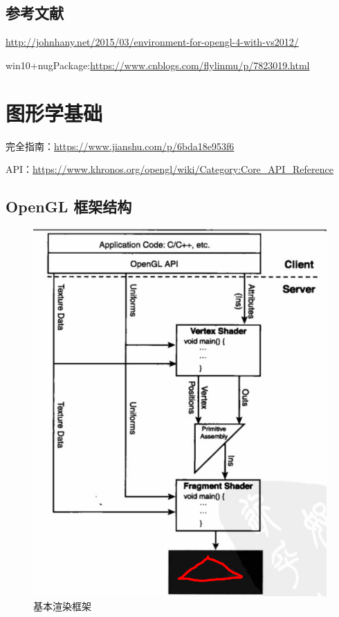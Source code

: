 \documentclass[UTF8,a4paper,12pt]{ctexbook}
\begin{document}
    \section{参考文献} 
    \url{http://johnhany.net/2015/03/environment-for-opengl-4-with-vs2012/}    
    
    win10+nugPackage:\url{https://www.cnblogs.com/flylinmu/p/7823019.html}
    


\newpage
\chapter{图形学基础}
	完全指南：\url{https://www.jianshu.com/p/6bda18e953f6}
	
	API：\url{https://www.khronos.org/opengl/wiki/Category:Core_API_Reference}
	
	\section{OpenGL 框架结构}
		\begin{figure}[H]
			\centering
			\includegraphics[width=.91\linewidth]{openGlArch}
			\caption{基本渲染框架}
		\end{figure}
			
\end{document}
